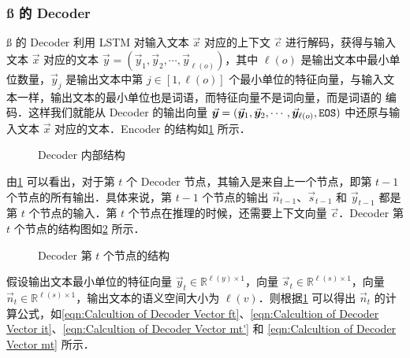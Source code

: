 \subsubsection{\ss{} 的 Decoder}
\label{eqn:Decoder of Seq2seq}
\indent\ss{} 的 Decoder 利用 LSTM 对输入文本 $\vec{x}$ 对应的上下文 $\vec{c}$ 进行解码，获得与输入文本 $\vec{x}$ 对应的文本 $\vec{y} = (\vec{y}_1, \vec{y}_2, \cdots, \vec{y}_{\ell(o)})$，其中 $\ell(o)$ 是输出文本中最小单位数量，$\vec{y}_j$ 是输出文本中第 $j\in[1, \ell(o)]$ 个最小单位的特征向量，与输入文本一样，输出文本的最小单位也是词语，而特征向量不是词向量，而是词语的  编码．这样我们就能从 Decoder 的输出向量 $\vec{y} = (\vec{y}_1, \vec{y}_2, \cdots, \vec{y}_{\ell(o)}, \text{\tt EOS})$ 中还原与输入文本 $\vec{x}$ 对应的文本．Encoder 的结构如\cref{fig:Inner Structure of Decoder} 所示．%
%
\begin{figure}[!htb]
  \centering
  \scalebox{0.6}{}
  \caption{Decoder 内部结构}
  \label{fig:Inner Structure of Decoder}
\end{figure}%
%
由\cref{fig:Inner Structure of Decoder} 可以看出，对于第 $t$ 个 Decoder 节点，其输入是来自上一个节点，即第 $t-1$ 个节点的所有输出．具体来说，第 $t-1$ 个节点的输出 $\vec{n}_{t-1}$、$\vec{s}_{t-1}$ 和 $\vec{y}_{t-1}$ 都是第 $t$ 个节点的输入．第 $t$ 个节点在推理的时候，还需要上下文向量 $\vec{c}$．Decoder 第 $t$ 个节点的结构图如\cref{fig:Inner Structure of Decoder Node} 所示．%
%
\begin{figure}[!htb]
  \centering
  \scalebox{0.7}{}
  \caption{Decoder 第 $t$ 个节点的结构}
  \label{fig:Inner Structure of Decoder Node}
\end{figure}%
%
假设输出文本最小单位的特征向量 $\vec{y}_t\in\mathbb{R}^{\ell(y)\times 1}$，向量 $\vec{s}_t\in\mathbb{R}^{\ell(s)\times 1}$，向量 $\vec{n}_t\in\mathbb{R}^{\ell(s)\times 1}$，输出文本的语义空间大小为 $\ell(v)$．则根据\cref{fig:Inner Structure of Decoder} 可以得出 $\vec{n}_t$ 的计算公式，如\cref{eqn:Calcultion of Decoder Vector ft}、\cref{eqn:Calcultion of Decoder Vector it}、\cref{eqn:Calcultion of Decoder Vector mt'} 和 \cref{eqn:Calcultion of Decoder Vector mt} 所示．%
%

